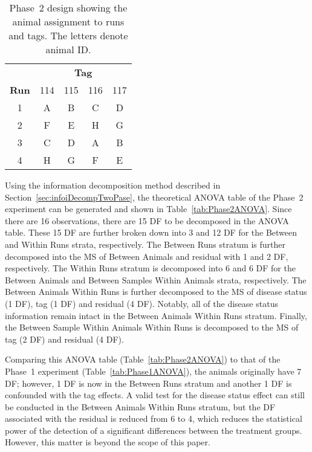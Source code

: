\documentclass[article]{jss}
\begin{document}
\begin{table}[ht]
\centering
\itshape
\caption{Phase~2 design showing the animal assignment to runs and tags. The letters denote animal ID.}
\begin{tabular}[t]{c|cccc}
 & \multicolumn{4}{c}{{\bf Tag}} \\
{\bf Run}  &  \textnormal{114} & \textnormal{115} & \textnormal{116} & \textnormal{117} \\ 
\hline 
\textnormal{1} & A & B & C & D \\ 
\textnormal{2} & F & E & H & G \\ 
\textnormal{3} & C & D & A & B \\ 
\textnormal{4} & H & G & F & E \\ 
\end{tabular} 
\label{tab:phase2Design}
\end{table}

Using the information decomposition method described in Section~\ref{sec:infoiDecompTwoPase}, the theoretical ANOVA table of the Phase~2 experiment can be generated and shown in Table~\ref{tab:Phase2ANOVA}. Since there are 16 observations, there are 15 DF to be decomposed in the ANOVA table. These 15 DF are further broken down into 3 and 12 DF for the Between and Within Runs strata, respectively. The Between Runs stratum is further decomposed into the MS of Between Animals and residual with 1 and 2 DF, respectively. The Within Runs stratum is decomposed into 6 and 6 DF for the Between Animals and Between Samples Within Animals strata, respectively. The Between Animals Within Runs is further decomposed to the MS of disease status (1 DF), tag (1 DF) and residual (4 DF). Notably, all of the disease status information remain intact in the Between Animals Within Runs stratum. Finally, the Between Sample Within Animals Within Runs is decomposed to the MS of tag (2 DF) and residual (4 DF).

Comparing this ANOVA table (Table~\ref{tab:Phase2ANOVA}) to that of the Phase~1 experiment (Table~\ref{tab:Phase1ANOVA}), the animals originally have 7 DF; however, 1 DF is now in the Between Runs stratum and another 1 DF is confounded with the tag effects. A valid test for the disease status effect can still be conducted in the Between Animals Within Runs stratum, but the DF associated with the residual is reduced from 6 to 4, which reduces the statistical power of the detection of a significant differences between the treatment groups. However, this matter is beyond the scope of this paper. 
\end{document}
